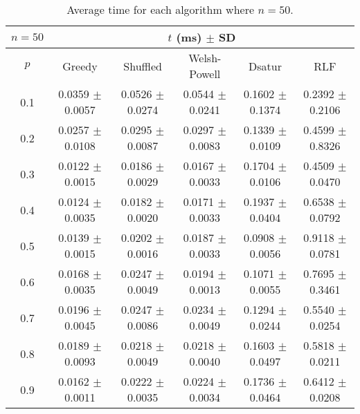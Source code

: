 \begin{table}[H]
    \centering
    \begin{tabular}{cccccc}
        
        $n = 50$& \multicolumn{5}{c}{$t$ (\unit{ms}) $\pm$ SD} \\
        \hline
        $p$ & Greedy & Shuffled & Welsh-Powell & Dsatur & RLF \\
        \hline
          0.1 & 0.0359 $\pm$ 0.0057 & 0.0526 $\pm$ 0.0274 & 0.0544 $\pm$ 0.0241 & 0.1602 $\pm$ 0.1374 & 0.2392 $\pm$ 0.2106 \\
        0.2 & 0.0257 $\pm$ 0.0108 & 0.0295 $\pm$ 0.0087 & 0.0297 $\pm$ 0.0083 & 0.1339 $\pm$ 0.0109 & 0.4599 $\pm$ 0.8326 \\
        0.3 & 0.0122 $\pm$ 0.0015 & 0.0186 $\pm$ 0.0029 & 0.0167 $\pm$ 0.0033 & 0.1704 $\pm$ 0.0106 & 0.4509 $\pm$ 0.0470 \\
        0.4 & 0.0124 $\pm$ 0.0035 & 0.0182 $\pm$ 0.0020 & 0.0171 $\pm$ 0.0033 & 0.1937 $\pm$ 0.0404 & 0.6538 $\pm$ 0.0792 \\
        0.5 & 0.0139 $\pm$ 0.0015 & 0.0202 $\pm$ 0.0016 & 0.0187 $\pm$ 0.0033 & 0.0908 $\pm$ 0.0056 & 0.9118 $\pm$ 0.0781 \\
        0.6 & 0.0168 $\pm$ 0.0035 & 0.0247 $\pm$ 0.0049 & 0.0194 $\pm$ 0.0013 & 0.1071 $\pm$ 0.0055 & 0.7695 $\pm$ 0.3461 \\
        0.7 & 0.0196 $\pm$ 0.0045 & 0.0247 $\pm$ 0.0086 & 0.0234 $\pm$ 0.0049 & 0.1294 $\pm$ 0.0244 & 0.5540 $\pm$ 0.0254 \\
        0.8 & 0.0189 $\pm$ 0.0093 & 0.0218 $\pm$ 0.0049 & 0.0218 $\pm$ 0.0040 & 0.1603 $\pm$ 0.0497 & 0.5818 $\pm$ 0.0211 \\
        0.9 & 0.0162 $\pm$ 0.0011 & 0.0222 $\pm$ 0.0035 & 0.0224 $\pm$ 0.0034 & 0.1736 $\pm$ 0.0464 & 0.6412 $\pm$ 0.0208 \\   
        \hline
    \end{tabular}
    \caption{Average time for each algorithm where $n = 50$.}
    \label{tab:avgTimeforV50}
\end{table}

